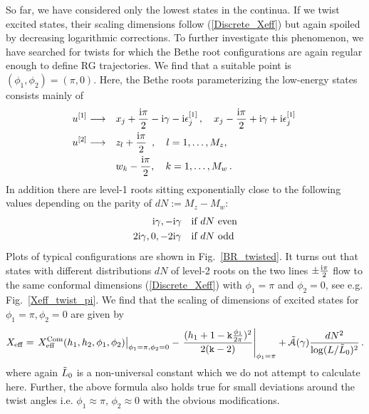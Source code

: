 \documentclass[12pt]{article}
\numberwithin{equation}{section}
\newcommand{\BR}[2]{u^{[#1]}_{#2}}
\newcommand{\ri}{{\rm i}}
\newcommand{\kk}{{\tt k}}
\begin{document}
	So far, we have considered only the lowest states in the continua. If we twist excited states, their scaling dimensions follow (\ref{Discrete_Xeff}) but again spoiled by decreasing logarithmic corrections. To further investigate this phenomenon, we have searched for twists for which the Bethe root configurations are again regular enough to define RG trajectories. We find that a suitable point is $(\phi_1,\phi_2)=(\pi,0)$. Here, the Bethe roots parameterizing the low-energy states consists mainly of
	\begin{equation}
		\begin{aligned}
			\BR{1}{} \longrightarrow&\quad x_j+ \frac{\ri\pi}{2}-\ri\gamma-\ri\epsilon^{[1]}_j\,, \quad x_j- \frac{\ri\pi}{2}+\ri\gamma+\ri\epsilon^{[1]}_j\, \\
			\BR{2}{} \longrightarrow&  \quad z_l+\frac{\ri \pi}{2}\,\,\,, \quad l=1,\dots,M_z, \\
			& \quad w_k-\frac{\ri \pi}{2}, \quad  k=1,\dots,M_w  \,.
		\end{aligned}
	\end{equation}
	In addition there are level-1 roots sitting exponentially close to the following values depending on the parity of $dN :=M_z-M_w$:
	\begin{equation}
		\label{Singular_roots}
		\begin{aligned}
			\ri \gamma,-\ri \gamma \quad &\text{if } dN  \text{ even}\\
			2\ri \gamma,0, -2\ri \gamma \quad &\text{if } dN  \text{ odd} 
		\end{aligned}
	\end{equation}
	Plots of typical configurations are shown in Fig.~\ref{BR_twisted}. It turns out that states with different distributions $dN$ of level-2 roots on the two lines $\pm \frac{\ri \pi}{2}$ flow to the same conformal dimensions (\ref{Discrete_Xeff}) with $\phi_1=\pi$ and $\phi_2=0$, see e.g. Fig.~\ref{Xeff_twist_pi}. We find that the scaling of dimensions of excited states for $\phi_1=\pi, \phi_2=0$ are given by 
	\begin{align}
		X_{\rm{eff}}=\left.X^{\rm{Com}}_{\rm{eff}}(h_1,h_2,\phi_1,\phi_2)\right|_{\phi_1=\pi, \phi_2=0}-\left.\frac{(h_{1}+1-\kk \frac{\phi_1}{2\pi})^2}{2( \kk-2)}\right|_{\phi_1=\pi}+\Tilde{\mathcal{A}}(\gamma)\frac{dN^2}{\log(L/\Tilde{L}_0)^2}\,.\label{Xeff_pi}
	\end{align}
	where again $\Tilde{L}_0$ is a non-universal constant which we do not attempt to calculate here. Further, the above formula also holds true for small deviations around the twist angles i.e. $\phi_1\approx \pi$, $\phi_2\approx 0$ with the obvious modifications. 
\end{document}
